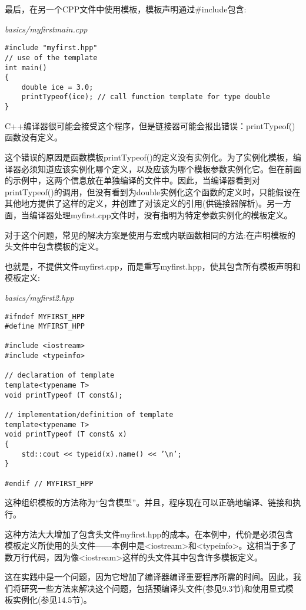 最后，在另一个CPP文件中使用模板，模板声明通过\#include包含:

\noindent
\textit{basics/myfirstmain.cpp}
\begin{lstlisting}[style=styleCXX]
#include "myfirst.hpp"
// use of the template
int main()
{
	double ice = 3.0;
	printTypeof(ice); // call function template for type double
}
\end{lstlisting}

C++编译器很可能会接受这个程序，但是链接器可能会报出错误：printTypeof()函数没有定义。

这个错误的原因是函数模板printTypeof()的定义没有实例化。为了实例化模板，编译器必须知道应该实例化哪个定义，以及应该为哪个模板参数实例化它。但在前面的示例中，这两个信息放在单独编译的文件中。因此，当编译器看到对printTypeof()的调用，但没有看到为double实例化这个函数的定义时，只能假设在其他地方提供了这样的定义，并创建了对该定义的引用(供链接器解析)。另一方面，当编译器处理myfirst.cpp文件时，没有指明为特定参数实例化的模板定义。


对于这个问题，常见的解决方案是使用与宏或内联函数相同的方法:在声明模板的头文件中包含模板的定义。

也就是，不提供文件myfirst.cpp，而是重写myfirst.hpp，使其包含所有模板声明和模板定义:

\noindent
\textit{basics/myfirst2.hpp}
\begin{lstlisting}[style=styleCXX]
#ifndef MYFIRST_HPP
#define MYFIRST_HPP

#include <iostream>
#include <typeinfo>

// declaration of template
template<typename T>
void printTypeof (T const&);

// implementation/definition of template
template<typename T>
void printTypeof (T const& x)
{
	std::cout << typeid(x).name() << ’\n’;
}

#endif // MYFIRST_HPP
\end{lstlisting}

这种组织模板的方法称为“包含模型”。并且，程序现在可以正确地编译、链接和执行。

这种方法大大增加了包含头文件myfirst.hpp的成本。在本例中，代价是必须包含模板定义所使用的头文件——本例中是<iostream>和<typeinfo>。这相当于多了数万行代码，因为像<iostream>这样的头文件其中包含许多模板定义。

这在实践中是一个问题，因为它增加了编译器编译重要程序所需的时间。因此，我们将研究一些方法来解决这个问题，包括预编译头文件(参见9.3节)和使用显式模板实例化(参见14.5节)。

